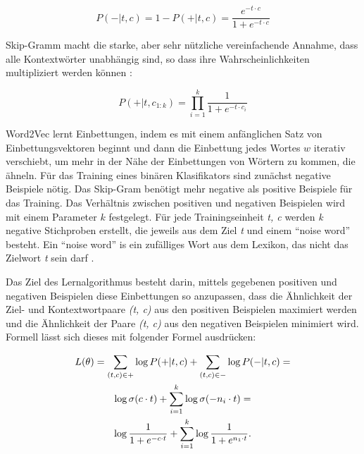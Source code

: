 \begin{equation} \label{Formel3_2}
    P(-|t,c) = 1-P(+|t,c) = \frac{e^{-t\cdot c}}{1+e^{-t\cdot c}}
\end{equation}

Skip-Gramm macht die starke, aber sehr nützliche vereinfachende Annahme, dass alle Kontextwörter unabhängig sind, so dass ihre Wahrscheinlichkeiten multipliziert werden können \cite*[112]{Jurafskya}:

\begin{equation} \label{Formel3_3}
    P(+|t,c_{1:k}) = \prod ^{k}_{i=1}\frac{1}{1+e^{-t\cdot c_{i}}}
\end{equation}


Word2Vec lernt Einbettungen, indem es mit einem anfänglichen Satz von Einbettungsvektoren beginnt und dann die Einbettung jedes Wortes $w$ iterativ verschiebt, um mehr in der Nähe der Einbettungen von Wörtern zu kommen, die ähneln. Für das Training eines binären Klasifikators sind zunächst negative Beispiele nötig. Das Skip-Gram benötigt mehr negative als positive Beispiele für das Training. Das Verhältnis zwischen positiven und negativen Beispielen wird mit einem Parameter $k$ festgelegt. Für jede Trainingseinheit \textit{t, c} werden \textit{k} negative Stichproben erstellt, die jeweils aus dem Ziel \textit{t} und einem \enquote{noise word} besteht. Ein \enquote{noise word} is ein zufälliges Wort aus dem Lexikon, das nicht das Zielwort \textit{t} sein darf \cite*[113]{Jurafskya}.

Das Ziel des Lernalgorithmus besteht darin, mittels gegebenen positiven und negativen Beispielen diese Einbettungen so anzupassen, dass die Ähnlichkeit der Ziel- und Kontextwortpaare \textit{(t, c)} aus den positiven Beispielen maximiert werden und die Ähnlichkeit der Paare \textit{(t, c)} aus den negativen Beispielen minimiert wird. Formell lässt sich dieses mit folgender Formel ausdrücken:

\begin{gather} \label{Formel3_5}
    L(\theta) = \sum_{(t,c)\in +}\log P(+|t,c)+\sum_{(t,c)\in -} \log P(-|t,c) =  \notag\\
    \log \sigma(c \cdot t)+\sum^{k}_{i=1}\log \sigma(-n_{i} \cdot t) = \notag\\
    \log \frac{1}{1+e^{-c \cdot t}}+\sum^{k}_{i=1}\log\frac{1}{1+e^{n_{1} \cdot t}}.
\end{gather}

